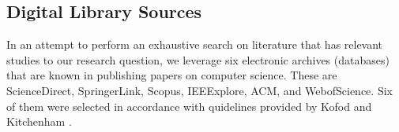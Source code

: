 \subsection{Digital Library Sources}

In an attempt to perform an exhaustive search on literature that has relevant studies to our research question, we leverage six electronic archives (databases) that are known in publishing papers on computer science. These are ScienceDirect, SpringerLink, Scopus, IEEExplore, ACM, and WebofScience.  Six of them were selected in accordance with quidelines provided by Kofod \cite{kofod-petersen_how_nodate} and Kitchenham \cite{kitchenham_guidelines_2007}. 



